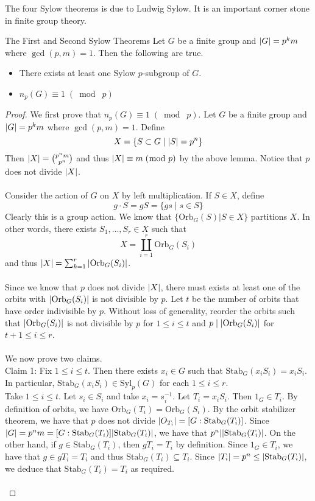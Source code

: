 \documentclass[a4paper]{article}
\begin{document}
The four Sylow theorems is due to Ludwig Sylow. It is an important corner stone in finite group theory. 

\begin{thm}{The First and Second Sylow Theorems}{} Let $G$ be a finite group and $\abs{G}=p^km$ where $\gcd(p,m)=1$. Then the following are true. 
\begin{itemize}
\item There exists at least one Sylow $p$-subgroup of $G$. 
\item $n_p(G)\equiv1\;(\bmod\;p)$
\end{itemize} \tcbline
\begin{proof}
We first prove that $n_p(G)\equiv 1\;(\bmod\;p)$. Let $G$ be a finite group and $\abs{G}=p^km$ where $\gcd(p,m)=1$. Define $$X=\{S\subset G\;|\;\abs{S}=p^n\}$$ Then $\abs{X}=\binom{p^nm}{p^n}$ and thus $\abs{X}\equiv m\;(\bmod\;p)$ by the above lemma. Notice that $p$ does not divide $\abs{X}$. \\~\\

Consider the action of $G$ on $X$ by left multiplication. If $S\in X$, define $$g\cdot S=gS=\{gs\;|\;s\in S\}$$ Clearly this is a group action. We know that $\{\text{Orb}_G(S)|S\in X\}$ partitions $X$. In other words, there exists $S_1,\dots,S_r\in X$ such that $$X=\coprod_{i=1}^r\text{Orb}_G(S_i)$$ and thus $\abs{X}=\sum_{k=1}^r\abs{\text{Orb}_G(S_i)}$. \\~\\
Since we know that $p$ does not divide $\abs{X}$, there must exists at least one of the orbits with $\abs{\text{Orb}_G(S_i)}$ is not divisible by $p$. Let $t$ be the number of orbits that have order indivisible by $p$. Without loss of generality, reorder the orbits such that $\abs{\text{Orb}_G(S_i)}$ is not divisible by $p$ for $1\leq i\leq t$ and $p\;|\;\abs{\text{Orb}_G(S_i)}$ for $t+1\leq i\leq r$. \\~\\

We now prove two claims. \\
Claim 1: Fix $1\leq i\leq t$. Then there exists $x_i\in G$ such that $\text{Stab}_G(x_iS_i)=x_iS_i$. In particular, $\text{Stab}_G(x_iS_i)\in\text{Syl}_p(G)$ for each $1\leq i\leq r$. \\
Take $1\leq i\leq t$. Let $s_i\in S_i$ and take $x_i=s_i^{-1}$. Let $T_i=x_iS_i$. Then $1_G\in T_i$. By definition of orbits, we have $\text{Orb}_G(T_i)=\text{Orb}_G(S_i)$. By the orbit stabilizer theorem, we have that $p$ does not divide $\abs{O_{T_i}}=[G:\text{Stab}_G(T_i)]$. Since $\abs{G}=p^nm=[G:\text{Stab}_G(T_i)]\abs{\text{Stab}_G(T_i)}$, we have that $p^n|\abs{\text{Stab}_G(T_i)}$. On the other hand, if $g\in\text{Stab}_G(T_i)$, then $gT_i=T_i$ by definition. Since $1_G\in T_i$, we have that $g\in gT_i=T_i$ and thus $\text{Stab}_G(T_i)\subseteq T_i$. Since $\abs{T_i}=p^n\leq\abs{\text{Stab}_G(T_i)}$, we deduce that $\text{Stab}_G(T_i)=T_i$ as required. \\~\\


\end{proof}
\end{thm}
\end{document}

